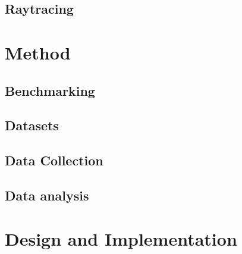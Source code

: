 \documentclass[11pt,twoside,a4paper]{report}
\begin{document}
\section{Raytracing}

\chapter{Method}
\section{Benchmarking}
\section{Datasets}
\section{Data Collection}
\section{Data analysis}

\chapter{Design and Implementation}
\end{document}
